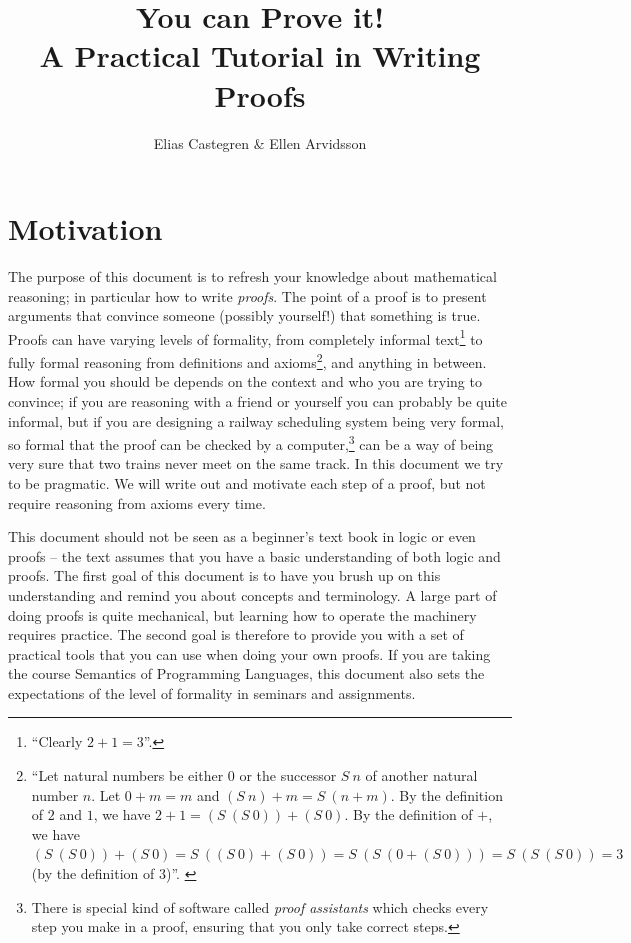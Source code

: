 \documentclass{tufte-handout}
\title[You can Prove it!]{You can Prove it!\\
{\large A Practical Tutorial in Writing Proofs}}
\author{Elias Castegren \& Ellen Arvidsson}
\begin{document}
\maketitle


\tableofcontents

\section{Motivation}

The purpose of this document is to refresh your knowledge about
mathematical reasoning; in particular how to write \emph{proofs}.
%
The point of a proof is to present arguments that convince someone
(possibly yourself!) that something is true.
%
Proofs can have varying levels of formality, from completely
informal text\footnote{``Clearly $2 + 1 = 3$''.} to fully formal
reasoning from definitions and axioms\footnote{``Let natural
  numbers be either 0 or the successor $S~n$ of another natural
  number $n$. Let $0 + m = m$ and $(S~n)+m = S~(n+m)$. By the
  definition of $2$ and $1$, we have $2 + 1 = (S~(S~0)) + (S~0)$.
  By the definition of $+$, we have
  $(S~(S~0)) + (S~0) = S~((S~0) + (S~0)) = S~(S~(0 + (S~0))) =
  S~(S~(S~0)) = 3$ (by the definition of $3$)''. \vspace{5mm}\label{footnote:plus}}, and anything
in between.
%
How formal you should be depends on the context and who you are
trying to convince; if you are reasoning with a friend or yourself
you can probably be quite informal, but if you are designing a
railway scheduling system being very formal, so formal that the
proof can be checked by a computer,\footnote{There is special kind of software called \emph{proof assistants}
  which checks every step you make in a proof, ensuring that you
  only take correct steps.} can be a way of being very sure that
two trains never meet on the same track.
%
In this document we try to be pragmatic. We will write out and
motivate each step of a proof, but not require reasoning from
axioms every time.

This document should not be seen as a beginner's text book in
logic or even proofs -- the text assumes that you have a basic
understanding of both logic and proofs. The first goal of this
document is to have you brush up on this understanding and remind
you about concepts and terminology. A large part of doing proofs
is quite mechanical, but learning how to operate the machinery
requires practice. The second goal is therefore to provide you
with a set of practical tools that you can use when doing your own
proofs.
%
If you are taking the course Semantics of Programming Languages,
this document also sets the expectations of the level of formality
in seminars and assignments.
\end{document}
